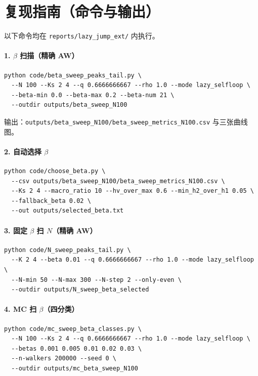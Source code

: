 \section{复现指南（命令与输出）}
以下命令均在 \texttt{reports/lazy\_jump\_ext/} 内执行。

\paragraph{1. \texorpdfstring{$\beta$}{beta} 扫描（精确 AW）}
\begin{verbatim}
python code/beta_sweep_peaks_tail.py \
  --N 100 --Ks 2 4 --q 0.6666666667 --rho 1.0 --mode lazy_selfloop \
  --beta-min 0.0 --beta-max 0.2 --beta-num 21 \
  --outdir outputs/beta_sweep_N100
\end{verbatim}
输出：\texttt{outputs/beta\_sweep\_N100/beta\_sweep\_metrics\_N100.csv} 与三张曲线图。

\paragraph{2. 自动选择 \texorpdfstring{$\beta$}{beta}}
\begin{verbatim}
python code/choose_beta.py \
  --csv outputs/beta_sweep_N100/beta_sweep_metrics_N100.csv \
  --Ks 2 4 --macro_ratio 10 --hv_over_max 0.6 --min_h2_over_h1 0.05 \
  --fallback_beta 0.02 \
  --out outputs/selected_beta.txt
\end{verbatim}

\paragraph{3. 固定 \texorpdfstring{$\beta$}{beta} 扫 \texorpdfstring{$N$}{N}（精确 AW）}
\begin{verbatim}
python code/N_sweep_peaks_tail.py \
  --K 2 4 --beta 0.01 --q 0.6666666667 --rho 1.0 --mode lazy_selfloop \
  --N-min 50 --N-max 300 --N-step 2 --only-even \
  --outdir outputs/N_sweep_beta_selected
\end{verbatim}

\paragraph{4. MC 扫 \texorpdfstring{$\beta$}{beta}（四分类）}
\begin{verbatim}
python code/mc_sweep_beta_classes.py \
  --N 100 --Ks 2 4 --q 0.6666666667 --rho 1.0 --mode lazy_selfloop \
  --betas 0.001 0.005 0.01 0.02 0.03 \
  --n-walkers 200000 --seed 0 \
  --outdir outputs/mc_beta_sweep_N100
\end{verbatim}

